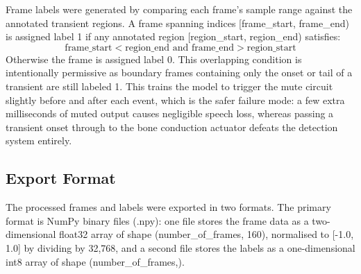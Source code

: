 Frame labels were generated by comparing each frame's sample range against the annotated transient regions. A frame spanning indices [frame\_start, frame\_end) is assigned label 1 if any annotated region [region\_start, region\_end) satisfies:
\[
\text{frame\_start} < \text{region\_end} 
\text{ and }
\text{frame\_end} > \text{region\_start}
\]
Otherwise the frame is assigned label 0. This overlapping condition is intentionally permissive as boundary frames containing only the onset or tail of a transient are still labeled 1. This trains the model to trigger the mute circuit slightly before and after each event, which is the safer failure mode: a few extra milliseconds of muted output causes negligible speech loss, whereas passing a transient onset through to the bone conduction actuator defeats the detection system entirely.






\subsection{Export Format}

The processed frames and labels were exported in two formats. The primary format is NumPy binary files (.npy): one file stores the frame data as a two-dimensional float32 array of shape (number\_of\_frames, 160), normalised to [-1.0, 1.0] by dividing by 32,768, and a second file stores the labels as a one-dimensional int8 array of shape (number\_of\_frames,).

